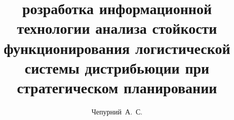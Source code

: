 \title{розработка информационной технологии анализа стойкости функционирования логистической системы дистрибьюции при стратегическом планировании}
\author{Чепурний~А.~С.}